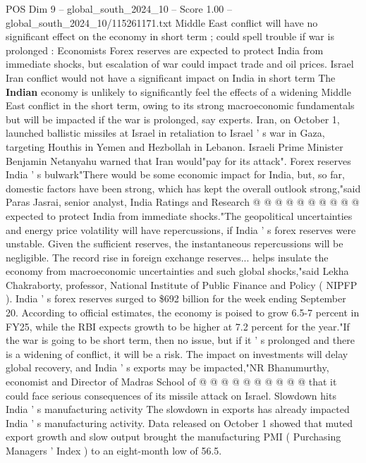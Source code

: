 \begin{textsample}{POS Dim 9 – global\_south\_2024\_10 – Score 1.00 – global\_south\_2024\_10/115261171.txt}  \label{ex:f9_pos_172}
Middle East conflict will have no significant effect on the economy in short term ; could spell trouble if war is prolonged : Economists Forex reserves are expected to protect India from immediate shocks, but escalation of war could impact trade and oil prices.
Israel Iran conflict would not have a significant impact on India in short term The \textbf{Indian} economy is unlikely to significantly feel the effects of a widening Middle East conflict in the short term, owing to its strong macroeconomic fundamentals but will be impacted if the war is prolonged, say experts.
Iran, on October 1, launched ballistic missiles at Israel in retaliation to Israel ' s war in Gaza, targeting Houthis in Yemen and Hezbollah in Lebanon.
Israeli Prime Minister Benjamin Netanyahu warned that Iran would"pay for its attack".
Forex reserves India ' s bulwark"There would be some economic impact for India, but, so far, domestic factors have been strong, which has kept the overall outlook strong,"said Paras Jasrai, senior analyst, India Ratings and Research @ @ @ @ @ @ @ @ @ @ expected to protect India from immediate shocks."The geopolitical uncertainties and energy price volatility will have repercussions, if India ' s forex reserves were unstable.
Given the sufficient reserves, the instantaneous repercussions will be negligible.
The record rise in foreign exchange reserves... helps insulate the economy from macroeconomic uncertainties and such global shocks,"said Lekha Chakraborty, professor, National Institute of Public Finance and Policy ( NIPFP ).
India ' s forex reserves surged to \$692 billion for the week ending September 20.
According to official estimates, the economy is poised to grow 6.5-7 percent in FY25, while the RBI expects growth to be higher at 7.2 percent for the year."If the war is going to be short term, then no issue, but if it ' s prolonged and there is a widening of conflict, it will be a risk.
The impact on investments will delay global recovery, and India ' s exports may be impacted,"NR Bhanumurthy, economist and Director of Madras School of @ @ @ @ @ @ @ @ @ @ that it could face serious consequences of its missile attack on Israel.
Slowdown hits India ' s manufacturing activity The slowdown in exports has already impacted India ' s manufacturing activity.
Data released on October 1 showed that muted export growth and slow output brought the manufacturing PMI ( Purchasing Managers ' Index ) to an eight-month low of 56.5.

\end{textsample}
